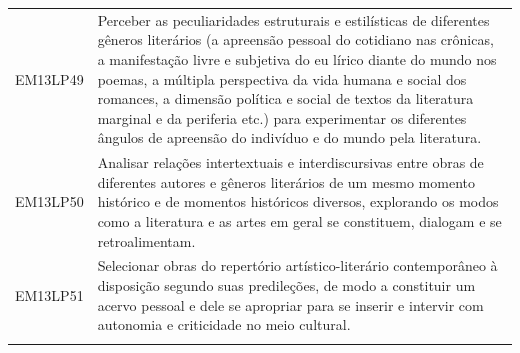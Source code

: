 \documentclass[12pt]{extarticle}
\begin{document}
\begin{longtable}{ll}
EM13LP49   & Perceber as peculiaridades estruturais e estilísticas de diferentes gêneros literários (a apreensão pessoal do cotidiano nas crônicas, a manifestação livre e subjetiva do eu lírico diante do mundo nos poemas, a múltipla perspectiva da vida humana e social dos romances, a dimensão política e social de textos da literatura marginal e da periferia etc.) para experimentar os diferentes ângulos de apreensão do indivíduo e do mundo pela literatura.                                                                                                                                                                                                                                                                                                                                                        \\
\rowcolor[HTML]{FFF} 
EM13LP50   & Analisar relações intertextuais e interdiscursivas entre obras de diferentes autores e gêneros literários de um mesmo momento histórico e de momentos históricos diversos, explorando os modos como a literatura e as artes em geral se constituem, dialogam e se retroalimentam.                                                                                                                                                                                                                                                                                                                                                                                                                                                                                                                                     \\
\rowcolor[HTML]{E0F7FA} 
EM13LP51   & Selecionar obras do repertório artístico-literário contemporâneo à disposição segundo suas predileções, de modo a constituir um acervo pessoal e dele se apropriar para se inserir e intervir com autonomia e criticidade no meio cultural.                                                                                                                                                                                                                                                                                                                                                                                                                                                                                                                                                                           \\
\rowcolor[HTML]{FFF} 

\end{longtable}
\end{document}
